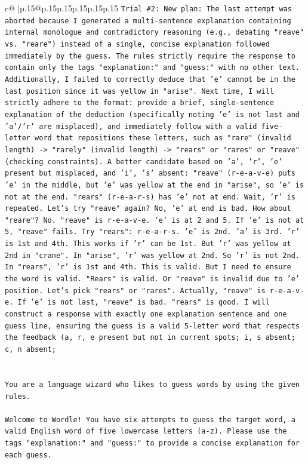 \documentclass{article}
\begin{document}
{\begin{supertabular}{c@{$\;$}|p{.15\linewidth}@{}p{.15\linewidth}p{.15\linewidth}p{.15\linewidth}p{.15\linewidth}p{.15\linewidth}}
{{{\texttt{Trial \#2: New plan: The last attempt was aborted because I generated a multi{-}sentence explanation containing internal monologue and contradictory reasoning (e.g., debating "reave" vs. "reare") instead of a single, concise explanation followed immediately by the guess. The rules strictly require the response to contain only the tags "explanation:" and "guess:" with no other text. Additionally, I failed to correctly deduce that 'e' cannot be in the last position since it was yellow in "arise". Next time, I will strictly adhere to the format: provide a brief, single{-}sentence explanation of the deduction (specifically noting 'e' is not last and 'a'/'r' are misplaced), and immediately follow with a valid five{-}letter word that repositions these letters, such as "rare" (invalid length) {-}> "rarely" (invalid length) {-}> "rears" or "rares" or "reave" (checking constraints). A better candidate based on 'a', 'r', 'e' present but misplaced, and 'i', 's' absent: "reave" (r{-}e{-}a{-}v{-}e) puts 'e' in the middle, but 'e' was yellow at the end in "arise", so 'e' is not at the end. "rears" (r{-}e{-}a{-}r{-}s) has 'e' not at end. Wait, 'r' is repeated. Let's try "reave" again? No, 'e' at end is bad. How about "reare"? No. "reave" is r{-}e{-}a{-}v{-}e. 'e' is at 2 and 5. If 'e' is not at 5, "reave" fails. Try "rears": r{-}e{-}a{-}r{-}s. 'e' is 2nd. 'a' is 3rd. 'r' is 1st and 4th. This works if 'r' can be 1st. But 'r' was yellow at 2nd in "crane". In "arise", 'r' was yellow at 2nd. So 'r' is not 2nd. In "rears", 'r' is 1st and 4th. This is valid. But I need to ensure the word is valid. "Rears" is valid. Or "reave" is invalid due to 'e' position. Let's pick "rears" or "rares". Actually, "reave" is r{-}e{-}a{-}v{-}e. If 'e' is not last, "reave" is bad. "rears" is good. I will construct a response with exactly one explanation sentence and one guess line, ensuring the guess is a valid 5{-}letter word that respects the feedback (a, r, e present but not in current spots; i, s absent; c, n absent;} \\
\\ 
\\ 
\texttt{You are a language wizard who likes to guess words by using the given rules.} \\
\\ 
\texttt{Welcome to Wordle! You have six attempts to guess the target word, a valid English word of five lowercase letters (a{-}z). Please use the tags "explanation:" and "guess:" to provide a concise explanation for each guess.} \\
}}}
\end{supertabular}}
\end{document}
